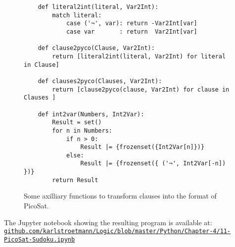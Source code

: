 \begin{figure}[!ht]
\centering
\begin{verbatim}
    def literal2int(literal, Var2Int):
        match literal:
            case ('¬', var): return -Var2Int[var]
            case var       : return  Var2Int[var]
    
    def clause2pyco(Clause, Var2Int):
        return [literal2int(literal, Var2Int) for literal in Clause]
    
    def clauses2pyco(Clauses, Var2Int):
        return [clause2pyco(clause, Var2Int) for clause in Clauses ]
    
    def int2var(Numbers, Int2Var):
        Result = set()
        for n in Numbers:
            if n > 0:
                Result |= {frozenset({Int2Var[n]})}
            else: 
                Result |= {frozenset({ ('¬', Int2Var[-n]) })}
        return Result
\end{verbatim}
\vspace*{-0.3cm}
\caption{Some axilliary functions to transform clauses into the format of PicoSat.}
\label{fig:sudoku-format}
\end{figure}

The Jupyter notebook showing the resulting program is available at:
\\[0.2cm]
\hspace*{0.3cm}
\href{https://github.com/karlstroetmann/Logic/blob/master/Python/Chapter-4/11-PicoSat-Sudoku.ipynb}{\texttt{github.com/karlstroetmann/Logic/blob/master/Python/Chapter-4/11-PicoSat-Sudoku.ipynb}}

\pagebreak


